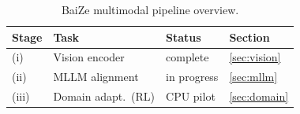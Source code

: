 \begin{table}[t]
\centering
\caption{BaiZe multimodal pipeline overview.}
\label{tab:pipeline}
\begin{tabular}{llll}
\toprule
\textbf{Stage} & \textbf{Task} & \textbf{Status} & \textbf{Section} \\
\midrule
(i) & Vision encoder & complete & \ref{sec:vision} \\
(ii) & MLLM alignment & in progress & \ref{sec:mllm} \\
(iii) & Domain adapt.\ (RL) & CPU pilot & \ref{sec:domain} \\
\bottomrule
\end{tabular}
\end{table}